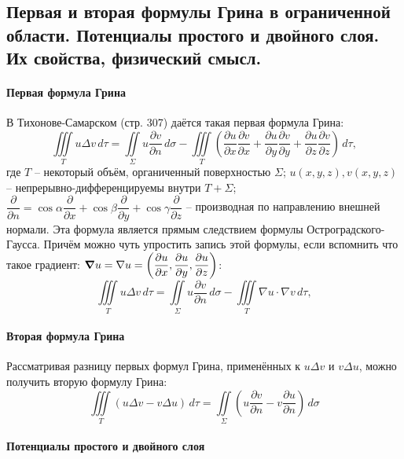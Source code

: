 \subsection{Первая и вторая формулы Грина в ограниченной области. Потенциалы простого и
двойного слоя. Их свойства, физический смысл.}

\paragraph{Первая формула Грина}

В Тихонове-Самарском (стр. 307) даётся такая первая формула Грина:
\[
  \iiint \limits_T u \Delta v \, d\tau
  = \iint \limits_\Sigma u \dfrac{\partial v}{\partial n} \, d\sigma
    - \iiint \limits_T \left(
      \dfrac{\partial u}{\partial x} \dfrac{\partial v}{\partial x} + 
      \dfrac{\partial u}{\partial y} \dfrac{\partial v}{\partial y} + 
      \dfrac{\partial u}{\partial z} \dfrac{\partial v}{\partial z} \right) \, d\tau,
\]
где $T$ -- некоторый объём, органиченный поверхностью $\Sigma$;
$u(x, y, z), v(x, y, z)$ -- непрерывно-дифференцируемы внутри $T+\Sigma$;
$\dfrac{\partial}{\partial n} = \cos\alpha \dfrac{\partial}{\partial x} 
  + \cos\beta \dfrac{\partial}{\partial y} 
  + \cos\gamma \dfrac{\partial}{\partial z}$ -- производная по направлению внешней нормали.
Эта формула является прямым следствием формулы Остроградского-Гаусса. Причём можно чуть упростить
запись этой формулы, если вспомнить что такое градиент:
$\grad u = \nabla u = \left( \dfrac{\partial u}{\partial x}, 
  \dfrac{\partial u}{\partial y},
  \dfrac{\partial u}{\partial z} \right) $:
\[
  \iiint \limits_T u \Delta v \, d\tau
  = \iint \limits_\Sigma u \dfrac{\partial v}{\partial n} \, d\sigma
    - \iiint \limits_T \nabla u \cdot \nabla v \, d\tau,
\]

\paragraph{Вторая формула Грина}

Рассматривая разницу первых формул Грина, применённых к $u \Delta v$ и $v \Delta u$, можно
получить вторую формулу Грина:
\[
  \iiint \limits_T \left( u \Delta v - v \Delta u \right) \, d\tau
  = \iint \limits_\Sigma \left( u \dfrac{\partial v}{\partial n} - v \dfrac{\partial u}{\partial n}  \right) \, d\sigma
\]

\paragraph{Потенциалы простого и двойного слоя}

